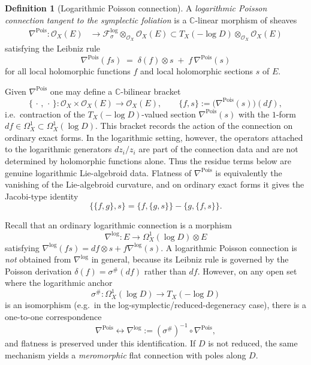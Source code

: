 \documentclass[11pt]{amsart}
\theoremstyle{plain}
\theoremstyle{definition}
\newtheorem{definition}[theorem]{Definition}
\newcommand{\fol}{\mathcal{F}}
\theoremstyle{definition}
\newcommand{\C}{\mathbb{C}}
\newcommand{\OO}{\mathcal{O}}
\begin{document}
\begin{definition}[Logarithmic Poisson connection]\label{def:logPois}
A \emph{logarithmic Poisson connection tangent to the symplectic foliation} is a $\C$-linear morphism of sheaves
\[
\begin{aligned}
\nabla^{\mathrm{Pois}}:\OO_X(E)&\longrightarrow \fol_\sigma^{\log}\otimes_{\OO_X}\OO_X(E) \subset T_X(-\log D)\otimes_{\OO_X}\OO_X(E) 
\end{aligned}
\]
satisfying the Leibniz rule
\begin{equation}\label{eq:Leibniz}
\nabla^{\mathrm{Pois}}(f s)
\;=\;
\delta(f)\otimes s \;+\; f\,\nabla^{\mathrm{Pois}}(s)
\end{equation}
for all local holomorphic functions $f$ and local holomorphic sections $s$ of $E$.
\end{definition}
Given $\nabla^{\mathrm{Pois}}$ one may define a $\C$-bilinear bracket
$$
\{\,\cdot\,,\,\cdot\,\}:\OO_X\times \OO_X(E)\to \OO_X(E),
\qquad
\{f,s\}:=\big(\nabla^{\mathrm{Pois}}(s)\big)(df),
$$
i.e.\ contraction of the $T_X(-\log D)$-valued section $\nabla^{\mathrm{Pois}}(s)$ with the $1$-form $df\in\Omega_X^1\subset\Omega_X^1(\log D)$.
This bracket records the action of the connection on ordinary exact forms. In the logarithmic setting, however, the operators attached to the logarithmic generators $dz_i/z_i$ are part of the connection data and are not determined by holomorphic functions alone. Thus the residue terms below are genuine logarithmic Lie-algebroid data. Flatness of $\nabla^{\mathrm{Pois}}$ is equivalently the vanishing of the Lie-algebroid curvature, and on ordinary exact forms it gives the Jacobi-type identity
$$
\{\{f,g\},s\}=\{f,\{g,s\}\}-\{g,\{f,s\}\}.
$$
 

 
Recall that an ordinary logarithmic connection is a morphism $$\nabla^{\log}:E\to\Omega_X^1(\log D)\otimes E$$
satisfying $\nabla^{\log}(fs)=df\otimes s+f\nabla^{\log}(s)$.
A logarithmic Poisson connection is \emph{not} obtained from $\nabla^{\log}$ in general,  because its Leibniz rule is governed by
the Poisson derivation $\delta(f)=\sigma^\#(df)$ rather than $df$.
However, on any open set where the logarithmic anchor
$$\sigma^\#:\Omega_X^1(\log D)\to T_X(-\log D)$$ is an isomorphism (e.g.\ in the log-symplectic/reduced-degeneracy case),
there is a one-to-one correspondence
$$
\nabla^{\mathrm{Pois}}
\longleftrightarrow
\nabla^{\log}:=(\sigma^\#)^{-1}\circ \nabla^{\mathrm{Pois}},
$$
and flatness is preserved under this identification. If $D$ is not reduced, the same mechanism yields a
\emph{meromorphic} flat connection with poles along $D$.
\end{document}

